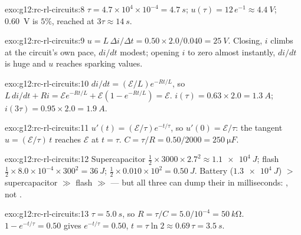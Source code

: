 \begin{solution}{exo:g12:rc-rl-circuits:8}
$\tau = 4.7\times10^{4} \times 10^{-4} = \qty{4.7}{s}$;
$u(\tau) = 12\,e^{-1} \approx \qty{4.4}{V}$; \qty{0.60}{V} is $5\%$,
reached at $3\tau \approx \qty{14}{s}$.
\end{solution}

\begin{solution}{exo:g12:rc-rl-circuits:9}
$u = L\,\Delta i/\Delta t = 0.50 \times 2.0/0.040 = \qty{25}{V}$.
Closing, $i$ climbs at the circuit's own pace, $di/dt$ modest; opening
\emph{} $i$ to zero almost instantly, $di/dt$ is huge and $u$
reaches sparking values.
\end{solution}

\begin{solution}{exo:g12:rc-rl-circuits:10}
$di/dt = (\mathcal{E}/L)e^{-Rt/L}$, so $L\,di/dt + Ri =
\mathcal{E}e^{-Rt/L} + \mathcal{E}(1 - e^{-Rt/L}) = \mathcal{E}$.
$i(\tau) = 0.63 \times 2.0 = \qty{1.3}{A}$;
$i(3\tau) = 0.95 \times 2.0 = \qty{1.9}{A}$.
\end{solution}

\begin{solution}{exo:g12:rc-rl-circuits:11}
$u'(t) = (\mathcal{E}/\tau)e^{-t/\tau}$, so $u'(0) = \mathcal{E}/\tau$:
the tangent $u = (\mathcal{E}/\tau)\,t$ reaches $\mathcal{E}$ at
$t = \tau$. $C = \tau/R = 0.50/2000 = \qty{250}{\micro F}$.
\end{solution}

\begin{solution}{exo:g12:rc-rl-circuits:12}
Supercapacitor $\tfrac12 \times 3000 \times 2.7^2 \approx \qty{1.1e4}{J}$;
flash $\tfrac12 \times 8.0\times10^{-4} \times 300^2 = \qty{36}{J}$;
 $\tfrac12 \times 0.010 \times 10^2 = \qty{0.50}{J}$. Battery
($\qty{1.3e4}{J}$) $>$ supercapacitor $\gg$ flash $\gg$  --- but all
three can dump their  in milliseconds: , not .
\end{solution}

\begin{solution}{exo:g12:rc-rl-circuits:13}
$\tau = \qty{5.0}{s}$, so $R = \tau/C = 5.0/10^{-4} = \qty{50}{k\ohm}$.
$1 - e^{-t/\tau} = 0.50$ gives $e^{-t/\tau} = 0.50$, $t = \tau\ln 2
\approx 0.69\,\tau = \qty{3.5}{s}$.
\end{solution}


